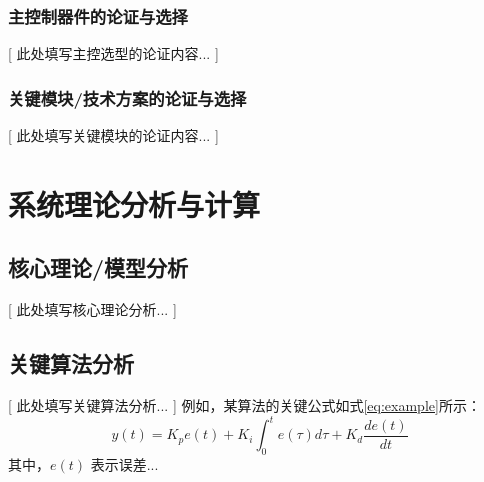 \documentclass{ctexart}
\begin{document}
\subsubsection{主控制器件的论证与选择}
    [ 此处填写主控选型的论证内容... ]

\subsubsection{关键模块/技术方案的论证与选择}
    [ 此处填写关键模块的论证内容... ]

\section{系统理论分析与计算}
\subsection{核心理论/模型分析}
    [ 此处填写核心理论分析... ]
    
    
\subsection{关键算法分析}
    [ 此处填写关键算法分析... ]
    例如，某算法的关键公式如式\ref{eq:example}所示：
    \begin{equation} \label{eq:example}
        y(t) = K_p e(t) + K_i \int_0^t e(\tau)d\tau + K_d \frac{de(t)}{dt}
    \end{equation}
    其中，$e(t)$ 表示误差... %
\end{document}
